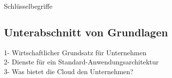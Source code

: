 Schlüsselbegriffe


\subsection{Unterabschnitt von Grundlagen}\label{subsec_UabsGrundl}


1- Wirtschaftlicher Grundsatz für Unternehmen
\\
2- Dienste für ein Standard-Anwendungsarchitektur 
\\
3- Was bietet die Cloud den Unternehmen?

